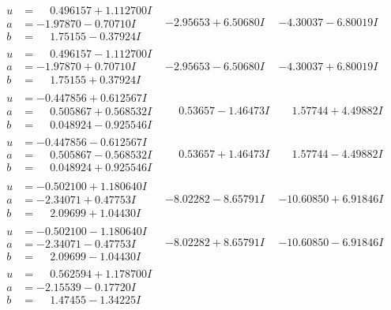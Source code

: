 \documentclass[1p]{elsarticle_modified}
\theoremstyle{definition}
\begin{document}
$$\begin{array}{c|c|c}
\begin{aligned}
u &= \phantom{-}0.496157 + 1.112700 I \\
a &= -1.97870 - 0.70710 I \\
b &= \phantom{-}1.75155 - 0.37924 I\end{aligned}
 & -2.95653 + 6.50680 I & -4.30037 - 6.80019 I \\ \hline\begin{aligned}
u &= \phantom{-}0.496157 - 1.112700 I \\
a &= -1.97870 + 0.70710 I \\
b &= \phantom{-}1.75155 + 0.37924 I\end{aligned}
 & -2.95653 - 6.50680 I & -4.30037 + 6.80019 I \\ \hline\begin{aligned}
u &= -0.447856 + 0.612567 I \\
a &= \phantom{-}0.505867 + 0.568532 I \\
b &= \phantom{-}0.048924 - 0.925546 I\end{aligned}
 & \phantom{-}0.53657 - 1.46473 I & \phantom{-}1.57744 + 4.49882 I \\ \hline\begin{aligned}
u &= -0.447856 - 0.612567 I \\
a &= \phantom{-}0.505867 - 0.568532 I \\
b &= \phantom{-}0.048924 + 0.925546 I\end{aligned}
 & \phantom{-}0.53657 + 1.46473 I & \phantom{-}1.57744 - 4.49882 I \\ \hline\begin{aligned}
u &= -0.502100 + 1.180640 I \\
a &= -2.34071 + 0.47753 I \\
b &= \phantom{-}2.09699 + 1.04430 I\end{aligned}
 & -8.02282 - 8.65791 I & -10.60850 + 6.91846 I \\ \hline\begin{aligned}
u &= -0.502100 - 1.180640 I \\
a &= -2.34071 - 0.47753 I \\
b &= \phantom{-}2.09699 - 1.04430 I\end{aligned}
 & -8.02282 + 8.65791 I & -10.60850 - 6.91846 I \\ \hline\begin{aligned}
u &= \phantom{-}0.562594 + 1.178700 I \\
a &= -2.15539 - 0.17720 I \\
b &= \phantom{-}1.47455 - 1.34225 I\end{aligned}

\end{array}$$
\end{document}
